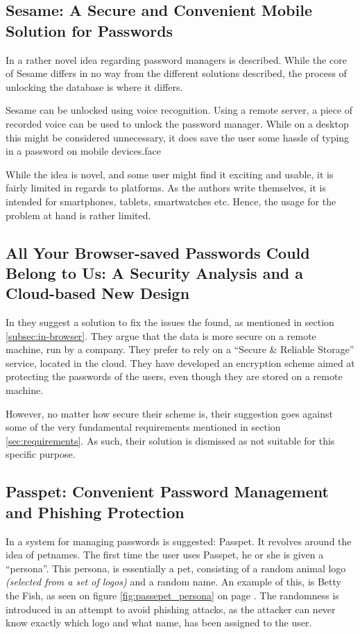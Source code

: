 		\subsection*{Sesame: A Secure and Convenient Mobile Solution for Passwords}
			In \cite{sesame} a rather novel idea regarding password managers is described. While the core of Sesame differs in no way from the different solutions described, the process of unlocking the database is where it differs.

			Sesame can be unlocked using voice recognition. Using a remote server, a piece of recorded voice can be used to unlock the password manager. While on a desktop this might be considered unnecessary, it does save the user some hassle of typing in a password on mobile devices.face

			While the idea is novel, and some user might find it exciting and usable, it is fairly limited in regards to platforms. As the authors write themselves, it is intended for smartphones, tablets, smartwatches etc. Hence, the usage for the problem at hand is rather limited.

		\subsection*{All Your Browser-saved Passwords Could Belong to Us: A Security Analysis and a Cloud-based New Design}
			In \cite{browser_saved} they suggest a solution to fix the issues the found, as mentioned in section \ref{subsec:in-browser}. They argue that the data is more secure on a remote machine, run by a company. They prefer to rely on a ``Secure \& Reliable Storage'' service, located in the cloud. They have developed an encryption scheme aimed at protecting the passwords of the users, even though they are stored on a remote machine. 

			However, no matter how secure their scheme is, their suggestion goes against some of the very fundamental requirements mentioned in section \ref{sec:requirements}. As such, their solution is dismissed as not suitable for this specific purpose. 

		\subsection*{Passpet: Convenient Password Management and Phishing Protection}
			In \cite{passpet} a system for managing passwords is suggested: Passpet. It revolves around the idea of petnames. The first time the user uses Passpet, he or she is given a ``persona''. This persona, is essentially a pet, consisting of a random animal logo \emph{(selected from a set of logos)} and a random name. An example of this, is Betty the Fish, as seen on figure \ref{fig:passepet_persona} on page \pageref{fig:passepet_persona}. The randomness is introduced in an attempt to avoid phishing attacks, as the attacker can never know exactly which logo and what name, has been assigned to the user.

